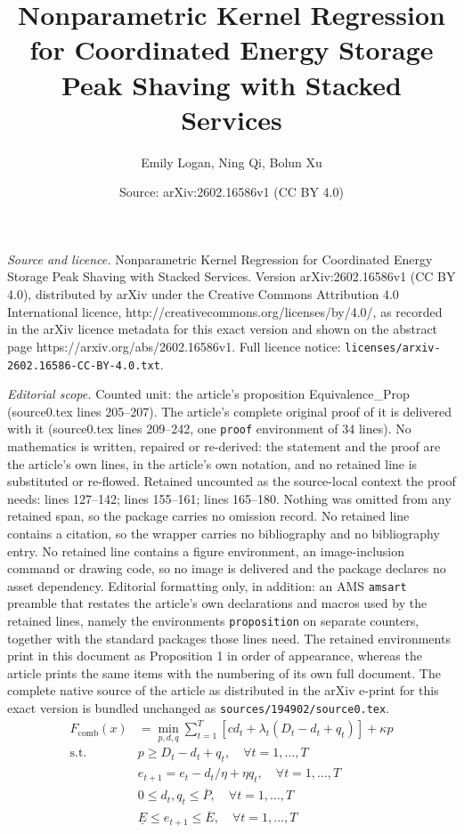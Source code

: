 \documentclass[10pt,a4paper]{amsart}
\title{Nonparametric Kernel Regression for Coordinated Energy Storage Peak Shaving with Stacked Services}
\author{Emily Logan, Ning Qi, Bolun Xu}
\date{Source: arXiv:2602.16586v1 (CC BY 4.0)}
\begin{document}
\maketitle

\noindent\emph{Source and licence.} Nonparametric Kernel Regression for Coordinated Energy Storage Peak Shaving with Stacked Services. Version arXiv:2602.16586v1 (CC BY 4.0), distributed by arXiv under the Creative Commons Attribution 4.0 International licence, http://creativecommons.org/licenses/by/4.0/, as recorded in the arXiv licence metadata for this exact version and shown on the abstract page https://arxiv.org/abs/2602.16586v1. Full licence notice: \texttt{licenses/arxiv-2602.16586-CC-BY-4.0.txt}.\par\smallskip

\noindent\textit{Editorial scope.} Counted unit: the article's proposition Equivalence\_Prop (source0.tex lines 205--207). The article's complete original proof of it is delivered with it (source0.tex lines 209--242, one \texttt{proof} environment of 34 lines). No mathematics is written, repaired or re-derived: the statement and the proof are the article's own lines, in the article's own notation, and no retained line is substituted or re-flowed.  Retained uncounted as the source-local context the proof needs: lines 127--142; lines 155--161; lines 165--180.  Nothing was omitted from any retained span, so the package carries no omission record.  No retained line contains a citation, so the wrapper carries no bibliography and no bibliography entry.  No retained line contains a figure environment, an image-inclusion command or drawing code, so no image is delivered and the package declares no asset dependency.  Editorial formatting only, in addition: an AMS \texttt{amsart} preamble that restates the article's own declarations and macros used by the retained lines, namely the environments \texttt{proposition} on separate counters, together with the standard packages those lines need.  The retained environments print in this document as Proposition 1 in order of appearance, whereas the article prints the same items with the numbering of its own full document.  The complete native source of the article as distributed in the arXiv e-print for this exact version is bundled unchanged as \texttt{sources/194902/source0.tex}.
\begin{subequations}\label{PS_and_Arb_Formulation}
\begin{align}
F_{\text{comb}}(x) &= \min_{p,d,q} \sum\nolimits_{t=1}^T 
\left[ c d_t + \lambda_t (D_t - d_t + q_t) \right] + \kappa p
\label{det_obj} \\
\text{s.t. } \quad
& p \ge D_t - d_t + q_t, \quad \forall t = 1, \dots, T
\label{peak_def} \\
& e_{t+1} = e_{t} - {d_t}/{\eta} + \eta q_t, \quad \forall t = 1, \dots, T
\label{soc_update} \\
& 0 \le d_t, q_t \le \overline{P}, \quad \forall t = 1, \dots, T
\label{power_bounds} \\
& \underline{E} \le e_{t+1} \le \overline{E}, \quad \forall t = 1, \dots, T
\label{energy_bounds}
\end{align}
\end{subequations}
\end{document}

